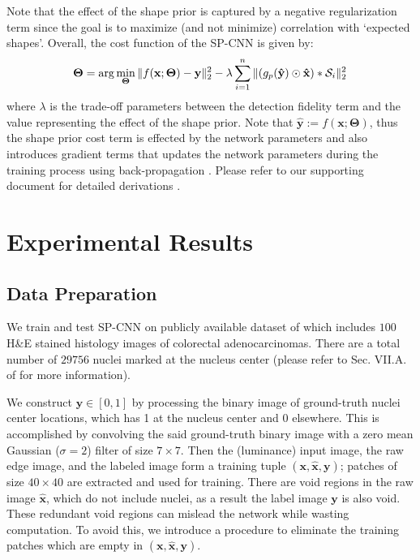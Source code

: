 \documentclass{article}
\begin{document}
Note that the effect of the shape prior is captured by a negative regularization term since the goal is to maximize (and not minimize) correlation with `expected shapes'. Overall, the cost function of the SP-CNN is given by:\vspace{-7pt}
\begin{equation}
\hspace{-1pt}\mathbf{\Theta} = \arg\min\limits_{\mathbf{\Theta}}\|f(\mathbf{x}; \mathbf{\Theta}) - \mathbf{y}\|_2^2 - \lambda\sum\limits_{i=1}^{n}  \|(g_{p}(\mathbf{\hat{y}})\odot \mathbf{\hat{x}}) \ast \mathcal{S}_i \|_2^2
\label{eq:costFunc}\vspace{-7pt}
\end{equation}
where $\lambda$ is the trade-off parameters between the detection fidelity term and the value representing the effect of the shape prior. Note that $\mathbf{\hat{y}}:=f(\mathbf{x}; \mathbf{\Theta})$, thus the shape prior cost term is effected by the network parameters and also introduces gradient terms that updates the network parameters during the training process using back-propagation \cite{lecun2015deep}. Please refer to our supporting document for detailed derivations \cite{webpage}.


\vspace{-5pt}
\section{Experimental Results}\vspace{-1mm}
\label{sec:experiments}
\subsection{Data Preparation}\vspace{-1pt}
\label{sec:data}
We train and test SP-CNN on publicly available dataset of \cite{SC_CNN} which includes $100$ H\&E stained histology images of colorectal adenocarcinomas. There are a total number of $29756$ nuclei marked at the nucleus center (please refer to Sec. VII.A. of \cite{SC_CNN} for more information).

We construct $\mathbf{y} \in [0,1]$ by processing the binary image of ground-truth nuclei center locations, which has 1 at the nucleus center and 0 elsewhere. This is accomplished by convolving the said ground-truth binary image with a zero mean Gaussian ($\sigma = 2$) filter of size $7 \times 7$. Then the (luminance) input image, the raw edge image, and the labeled image form a training tuple $(\mathbf{x}, \mathbf{\hat{x}}, \mathbf{y})$; patches of size $40\times 40$ are extracted and used for training. There are void regions in the raw image $\mathbf{\hat{x}}$, which do not include nuclei, as a result the label image $\mathbf{y}$ is also void. These redundant void regions can mislead the network while wasting computation. To avoid this, we introduce a procedure to eliminate the training patches which are empty in $(\mathbf{x}, \mathbf{\hat{x}}, \mathbf{y})$. %
\end{document}
